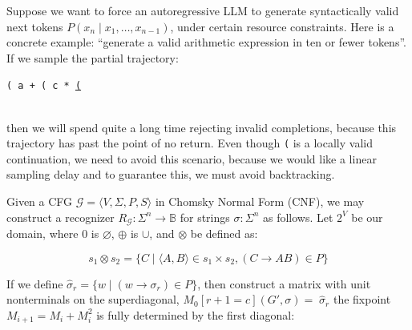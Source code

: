 \documentclass[portrait,a0b,final,a4resizeable]{a0poster}
\def\jointspacing{\vspace{0.3in}}
\begin{document}
\begin{poster}
\begin{multicols}{2}
\jointspacing

\null\hspace*{3cm}\begin{minipage}[c]{0.85\columnwidth}
Suppose we want to force an autoregressive LLM to generate syntactically valid next tokens $P(x_n \mid x_1, \ldots, x_{n-1})$, under certain resource constraints. Here is a concrete example: ``generate a valid arithmetic expression in ten or fewer tokens''. If we sample the partial trajectory:
\begin{center}\texttt{( a + ( c * }\underline{\texttt{(}}\end{center}\\
then we will spend quite a long time rejecting invalid completions, because this trajectory has past the point of no return. Even though \texttt{(} is a locally valid continuation, we need to avoid this scenario, because we would like a linear sampling delay and to guarantee this, we must avoid backtracking.
\end{minipage}

      \jointspacing

      \null\hspace*{3cm}\begin{minipage}[c]{0.85\columnwidth}
          Given a CFG $\mathcal{G} = \langle V, \Sigma, P, S\rangle$ in Chomsky Normal Form (CNF), we may construct a recognizer $R_\mathcal{G}: \Sigma^n \rightarrow \mathbb{B}$ for strings $\sigma: \Sigma^n$ as follows. Let $2^V$ be our domain, where $0$ is $\varnothing$, $\oplus$ is $\cup$, and $\otimes$ be defined as:\vspace{0.5cm}
      \end{minipage}

      \[
        s_1 \otimes s_2 = \{C \mid \langle A, B\rangle \in s_1 \times s_2, (C\rightarrow AB) \in P\}
      \]

      \null\hspace*{3cm}\begin{minipage}[c]{0.85\columnwidth}
If we define $\hat\sigma_r = \{w \mid (w \rightarrow \sigma_r) \in P\}$, then construct a matrix with unit nonterminals on the superdiagonal, $M_0[r+1=c](G', \sigma) = \;\hat\sigma_r$ the fixpoint $M_{i+1} = M_i + M_i^2$ is fully determined by the first diagonal:\vspace{0.5cm}
\end{minipage}


\end{multicols}
\end{poster}
\end{document}
